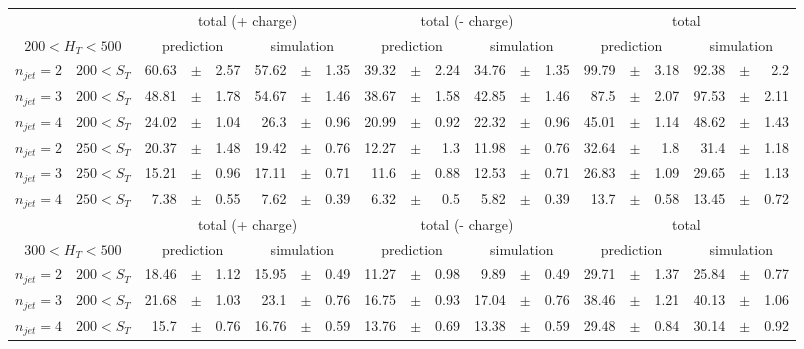 \documentclass[12pt]{paper}
\begin{document}
\begin{sidewaystable}[ht]
\begin{center}
\begin{tabular}{cc|rrr|rrr|rrr|rrr|rrr|rrr}
& & \multicolumn{6}{c|}{total (+ charge)}&\multicolumn{6}{c|}{total (- charge)}&\multicolumn{6}{c}{total}\\
\multicolumn{2}{c|}{$200< H_{T}< 500$} & \multicolumn{3}{c}{prediction}&\multicolumn{3}{c|}{simulation}&\multicolumn{3}{c}{prediction}&\multicolumn{3}{c|}{simulation}&\multicolumn{3}{c}{prediction}&\multicolumn{3}{c}{simulation}\\\hline
$n_{jet}=2$ & $200< S_{T}$ & 60.63&$\pm$&2.57 & 57.62&$\pm$&1.35 & 39.32&$\pm$&2.24 & 34.76&$\pm$&1.35 & 99.79&$\pm$&3.18 & 92.38&$\pm$&2.2\\
$n_{jet}=3$ & $200< S_{T}$ & 48.81&$\pm$&1.78 & 54.67&$\pm$&1.46 & 38.67&$\pm$&1.58 & 42.85&$\pm$&1.46 & 87.5&$\pm$&2.07 & 97.53&$\pm$&2.11\\
$n_{jet}=4$ & $200< S_{T}$ & 24.02&$\pm$&1.04 & 26.3&$\pm$&0.96 & 20.99&$\pm$&0.92 & 22.32&$\pm$&0.96 & 45.01&$\pm$&1.14 & 48.62&$\pm$&1.43\\
$n_{jet}=2$ & $250< S_{T}$ & 20.37&$\pm$&1.48 & 19.42&$\pm$&0.76 & 12.27&$\pm$&1.3 & 11.98&$\pm$&0.76 & 32.64&$\pm$&1.8 & 31.4&$\pm$&1.18\\
$n_{jet}=3$ & $250< S_{T}$ & 15.21&$\pm$&0.96 & 17.11&$\pm$&0.71 & 11.6&$\pm$&0.88 & 12.53&$\pm$&0.71 & 26.83&$\pm$&1.09 & 29.65&$\pm$&1.13\\
$n_{jet}=4$ & $250< S_{T}$ & 7.38&$\pm$&0.55 & 7.62&$\pm$&0.39 & 6.32&$\pm$&0.5 & 5.82&$\pm$&0.39 & 13.7&$\pm$&0.58 & 13.45&$\pm$&0.72\\
\hline
& & \multicolumn{6}{c|}{total (+ charge)}&\multicolumn{6}{c|}{total (- charge)}&\multicolumn{6}{c}{total}\\
\multicolumn{2}{c|}{$300< H_{T}< 500$} & \multicolumn{3}{c}{prediction}&\multicolumn{3}{c|}{simulation}&\multicolumn{3}{c}{prediction}&\multicolumn{3}{c|}{simulation}&\multicolumn{3}{c}{prediction}&\multicolumn{3}{c}{simulation}\\\hline
$n_{jet}=2$ & $200< S_{T}$ & 18.46&$\pm$&1.12 & 15.95&$\pm$&0.49 & 11.27&$\pm$&0.98 & 9.89&$\pm$&0.49 & 29.71&$\pm$&1.37 & 25.84&$\pm$&0.77\\
$n_{jet}=3$ & $200< S_{T}$ & 21.68&$\pm$&1.03 & 23.1&$\pm$&0.76 & 16.75&$\pm$&0.93 & 17.04&$\pm$&0.76 & 38.46&$\pm$&1.21 & 40.13&$\pm$&1.06\\
$n_{jet}=4$ & $200< S_{T}$ & 15.7&$\pm$&0.76 & 16.76&$\pm$&0.59 & 13.76&$\pm$&0.69 & 13.38&$\pm$&0.59 & 29.48&$\pm$&0.84 & 30.14&$\pm$&0.92\\

\end{tabular}
\end{center}
\end{sidewaystable}
\end{document}
